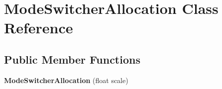 \hypertarget{classModeSwitcherAllocation}{\section{Mode\-Switcher\-Allocation Class Reference}
\label{classModeSwitcherAllocation}
}
\subsection*{Public Member Functions}
\begin{DoxyCompactItemize}
\item 
\hypertarget{classModeSwitcherAllocation_ac1bc6f803b2905d484885ef33d7bdb6d}{{\bfseries Mode\-Switcher\-Allocation} (float scale)}\label{classModeSwitcherAllocation_ac1bc6f803b2905d484885ef33d7bdb6d}

\end{DoxyCompactItemize}
